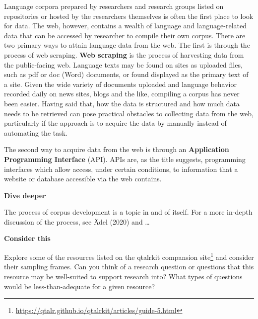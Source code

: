 \documentclass[
  letterpaper,
]{latex/krantz}
\DeclareRobustCommand{\href}[2]{#2\footnote{\url{#1}}}
\begin{document}
Language corpora prepared by researchers and research groups listed on
repositories or hosted by the researchers themselves is often the first
place to look for data. The web, however, contains a wealth of language
and language-related data that can be accessed by researcher to compile
their own corpus. There are two primary ways to attain language data
from the web. The first is through the process of web scraping.
\textbf{Web scraping} is the process of harvesting data from the
public-facing web. Language texts may be found on sites as uploaded
files, such as pdf or doc (Word) documents, or found displayed as the
primary text of a site. Given the wide variety of documents uploaded and
language behavior recorded daily on news sites, blogs and the like,
compiling a corpus has never been easier. Having said that, how the data
is structured and how much data needs to be retrieved can pose practical
obstacles to collecting data from the web, particularly if the approach
is to acquire the data by manually instead of automating the task.

The second way to acquire data from the web is through an
\textbf{Application Programming Interface} (API). APIs are, as the title
suggests, programming interfaces which allow access, under certain
conditions, to information that a website or database accessible via the
web contains.

\begin{tcolorbox}[enhanced jigsaw, left=2mm, arc=.35mm, colback=white, rightrule=.15mm, toprule=.15mm, breakable, leftrule=.75mm, opacityback=0, bottomrule=.15mm]

\textbf{ Dive deeper}

The process of corpus development is a topic in and of itself. For a
more in-depth discussion of the process, see Ädel (2020) and \ldots{}

\end{tcolorbox}

\begin{tcolorbox}[enhanced jigsaw, left=2mm, arc=.35mm, colback=white, rightrule=.15mm, toprule=.15mm, breakable, leftrule=.75mm, opacityback=0, bottomrule=.15mm]

\textbf{ Consider this}

Explore some of the resources listed on the
\href{https://qtalr.github.io/qtalrkit/articles/guide-5.html}{qtalrkit
compansion site} and consider their sampling frames. Can you think of a
research question or questions that this resource may be well-suited to
support research into? What types of questions would be
less-than-adequate for a given resource?

\end{tcolorbox}
\end{document}
